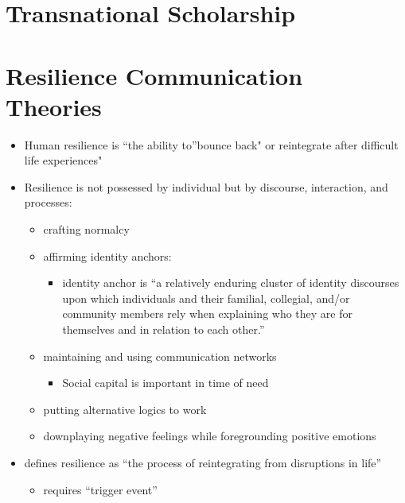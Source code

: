 \documentclass[
]{book}
\providecommand{\tightlist}{%
  \setlength{\itemsep}{0pt}\setlength{\parskip}{0pt}}
\begin{document}
\hypertarget{transnational-scholarship}{%
\section{Transnational Scholarship}\label{transnational-scholarship}}

\hypertarget{resilience-communication-theories}{%
\section{Resilience Communication Theories}\label{resilience-communication-theories}}

\citep{Buzzanell_2010}

\begin{itemize}
\item
  Human resilience is ``the ability to''bounce back" or reintegrate after difficult life experiences"
\item
  Resilience is not possessed by individual but by discourse, interaction, and processes:

  \begin{itemize}
  \item
    crafting normalcy
  \item
    affirming identity anchors:

    \begin{itemize}
    \tightlist
    \item
      identity anchor is ``a relatively enduring cluster of identity discourses upon which individuals and their familial, collegial, and/or community members rely when explaining who they are for themselves and in relation to each other.''
    \end{itemize}
  \item
    maintaining and using communication networks

    \begin{itemize}
    \tightlist
    \item
      Social capital is important in time of need
    \end{itemize}
  \item
    putting alternative logics to work
  \item
    downplaying negative feelings while foregrounding positive emotions
  \end{itemize}
\item
  \citep{Richardson_2002} defines resilience as ``the process of reintegrating from disruptions in life''

  \begin{itemize}
  \tightlist
  \item
    requires ``trigger event''
  \end{itemize}
\end{itemize}
\end{document}
